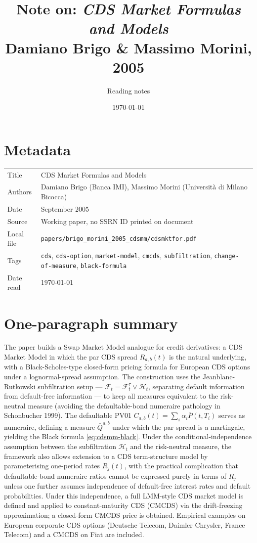 \documentclass[11pt,a4paper]{article}
\title{Note on: \emph{CDS Market Formulas and Models}\\
       \large Damiano Brigo \& Massimo Morini, 2005}
\author{Reading notes}
\date{\today}
\begin{document}
\maketitle

\section*{Metadata}
\begin{tabular}{@{}p{3.5cm}p{11cm}@{}}
\toprule
Title           & CDS Market Formulas and Models \\
Authors         & Damiano Brigo (Banca IMI), Massimo Morini (Università di Milano Bicocca) \\
Date            & September 2005 \\
Source          & Working paper, no SSRN ID printed on document \\
Local file      & \texttt{papers/brigo\_morini\_2005\_cdsmm/cdsmktfor.pdf} \\
Tags            & \texttt{cds}, \texttt{cds-option}, \texttt{market-model}, \texttt{cmcds},
                  \texttt{subfiltration}, \texttt{change-of-measure}, \texttt{black-formula} \\
Date read       & \today \\
\bottomrule
\end{tabular}

\section*{One-paragraph summary}
The paper builds a Swap Market Model analogue for credit derivatives:
a CDS Market Model in which the par CDS spread $R_{a,b}(t)$ is the
natural underlying, with a Black-Scholes-type closed-form pricing
formula for European CDS options under a lognormal-spread assumption.
The construction uses the Jeanblanc-Rutkowski subfiltration setup ---
$\mathcal{F}_t = \mathcal{F}^\tau_t \vee \mathcal{H}_t$, separating
default information from default-free information --- to keep all
measures equivalent to the risk-neutral measure (avoiding the
defaultable-bond numeraire pathology in Schonbucher 1999). The
defaultable PV01 $C_{a,b}(t) = \sum_i \alpha_i \bar P(t, T_i)$ serves
as numeraire, defining a measure $\bar Q^{a,b}$ under which the par
spread is a martingale, yielding the Black formula
\eqref{eq:cdsmm-black}. Under the conditional-independence assumption
between the subfiltration $\mathcal{H}_t$ and the risk-neutral
measure, the framework also allows extension to a CDS term-structure
model by parameterising one-period rates $R_j(t)$, with the
practical complication that defaultable-bond numeraire ratios cannot
be expressed purely in terms of $R_j$ unless one further assumes
independence of default-free interest rates and default probabilities.
Under this independence, a full LMM-style CDS market model is
defined and applied to constant-maturity CDS (CMCDS) via the
drift-freezing approximation; a closed-form CMCDS price is obtained.
Empirical examples on European corporate CDS options (Deutsche
Telecom, Daimler Chrysler, France Telecom) and a CMCDS on Fiat are
included.
\end{document}
